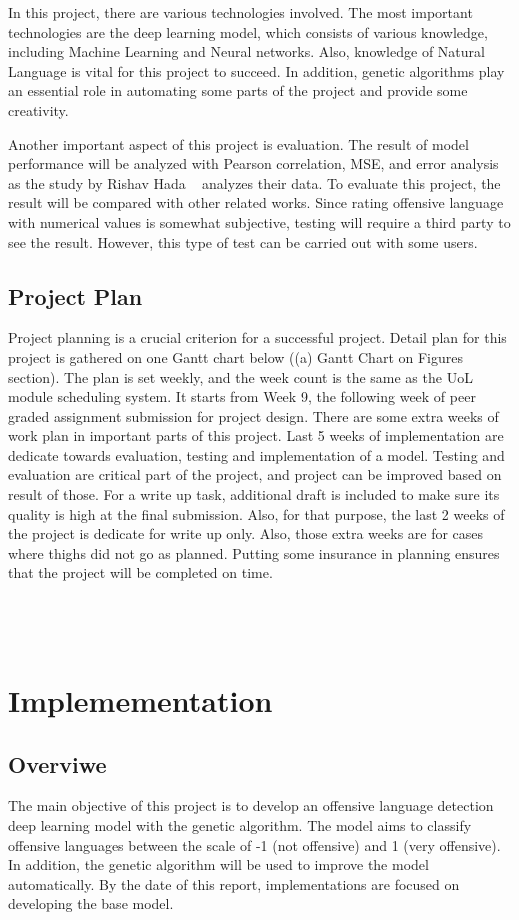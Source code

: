 \documentclass[11pt, natbib=false]{article}
\begin{document}
\begin{multicols}{2}
In this project, there are various technologies involved.
The most important technologies are the deep learning model, which consists of various knowledge, including Machine Learning and Neural networks.
Also, knowledge of Natural Language is vital for this project to succeed.
In addition, genetic algorithms play an essential role in automating some parts of the project and provide some creativity.

Another important aspect of this project is evaluation.
The result of model performance will be analyzed with Pearson correlation, MSE, and error analysis as the study by Rishav Hada ~\cite{hada2021ruddit} analyzes their data.
To evaluate this project, the result will be compared with other related works.
Since rating offensive language with numerical values is somewhat subjective, testing will require a third party to see the result.
However, this type of test can be carried out with some users. 

\subsection{Project Plan}
Project planning is a crucial criterion for a successful project. Detail plan for this project is gathered on one Gantt chart below ((a) Gantt Chart on Figures section).
The plan is set weekly, and the week count is the same as the UoL module scheduling system.
It starts from Week 9, the following week of peer graded assignment submission for project design.
There are some extra weeks of work plan in important parts of this project.
Last 5 weeks of implementation are dedicate towards evaluation, testing and implementation of a model.
Testing and evaluation are critical part of the project, and project can be improved based on result of those.
For a write up task, additional draft is included to make sure its quality is high at the final submission.
Also, for that purpose, the last 2 weeks of the project is dedicate for write up only.
Also, those extra weeks are for cases where thighs did not go as planned.
Putting some insurance in planning ensures that the project will be completed on time. \\
\\
\\
\\

\section{Implemementation}
\subsection{Overviwe}
The main objective of this project is to develop an offensive language detection deep learning model with the genetic algorithm.
The model aims to classify offensive languages between the scale of -1 (not offensive) and 1 (very offensive).
In addition, the genetic algorithm will be used to improve the model automatically.
By the date of this report, implementations are focused on developing the base model.


\end{multicols}
\end{document}

